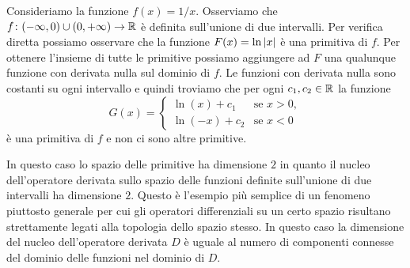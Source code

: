 \begin{example}
\label{ex:primitive_non_connesso}%
\mymark{*}%
Consideriamo la funzione $f(x) = 1/x$. Osserviamo che
$f\colon (-\infty, 0) \cup (0,+\infty)\to {\mathbb R}$ è definita sull'unione di due
intervalli. Per verifica diretta possiamo osservare che la funzione
$F(x) = \ln {\left|x\right|}$ è una primitiva di $f$. Per ottenere l'insieme di tutte
le primitive possiamo aggiungere ad $F$ una qualunque funzione con derivata
nulla sul dominio di $f$. Le funzioni con derivata nulla sono costanti su ogni
intervallo e quindi troviamo che per ogni $c_1, c_2\in {\mathbb R}$ la funzione
\[
G(x) =
\begin{cases}
  \ln (x) + c_1 &\text{se $x>0$},\\
  \ln (-x) + c_2 & \text{se $x<0$}
\end{cases}
\]
è una primitiva di $f$ e non ci sono altre primitive.

In questo caso lo spazio delle primitive ha dimensione $2$ in quanto il nucleo
dell'operatore derivata sullo spazio delle funzioni definite sull'unione di
due intervalli ha dimensione $2$.
Questo è l'esempio più semplice di un fenomeno piuttosto generale per cui gli
operatori differenziali su un certo spazio risultano strettamente legati alla
topologia dello spazio stesso. In questo caso la dimensione del nucleo
dell'operatore derivata $D$ è uguale al numero di componenti connesse del
dominio delle funzioni nel dominio di $D$.
\end{example}

